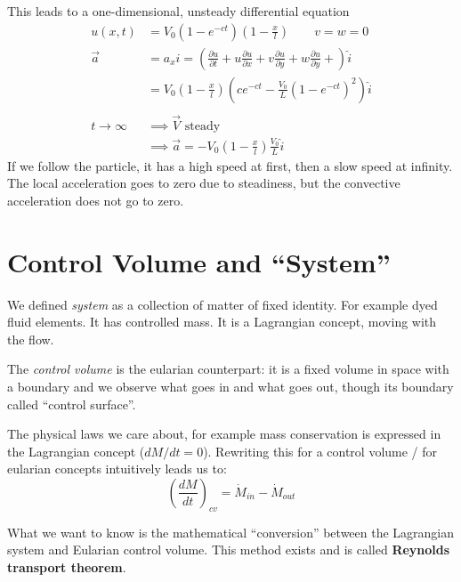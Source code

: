 This leads to a one-dimensional, unsteady differential equation
\begin{equation*}
	\begin{split}
		u(x,t) &= V_0(1-e^{-ct})\left(1-\frac xl\right)\qquad v=w=0\\
		\vec a & = a_x \hat i  = \left(
		\frac{\partial u}{\partial t} + 
		u\frac{\partial u}{\partial x} + 
		v\frac{\partial u}{\partial y} + 
		w\frac{\partial u}{\partial y} + 
		\right)\hat i\\ &= V_0\left(1-\frac xl\right) \left(ce^{-ct}-\frac {V_0}L\left(1-e^{-ct}\right)^2\right)\hat i\\\\
		t\to \infty &\implies\vec V \text{ steady}\\
		& \implies \vec a  =-V_0\left(1-\frac xl\right)\frac {V_0}L\hat i
	\end{split}
\end{equation*}
If we follow the particle, it has a high speed at first, then a slow speed at infinity. The local acceleration goes to zero due to steadiness, but the convective acceleration does not go to zero.

\section{Control Volume and \enquote{System}}
We defined \textit{system} as a collection of matter of fixed identity. For example dyed fluid elements. It has controlled mass. It is a Lagrangian concept, moving with the flow.

The \textit{control volume} is the eularian counterpart: it is a fixed volume in space with a boundary and we observe what goes in and what goes out, though its boundary called \enquote{control surface}.

The physical laws we care about, for example mass conservation is expressed in the Lagrangian concept ($dM/dt = 0$). Rewriting this for a control volume / for eularian concepts intuitively leads us to:
\begin{equation*}
	\left(\frac{dM}{dt}\right)_{cv} = \dot M_{in} - \dot M_{out}
\end{equation*}

What we want to know is the mathematical \enquote{conversion} between the Lagrangian system and Eularian control volume. This method exists and is called \textbf{Reynolds transport theorem}.